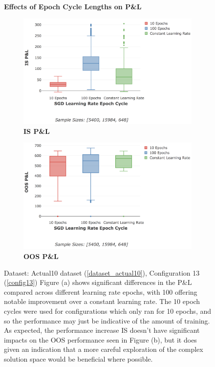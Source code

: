 \documentclass[a4paper,11pt,oneside]{article}
\theoremstyle{plain}
\theoremstyle{definition}
\begin{document}
		
	\begin{figure}[H]
		\centering
		\textbf{Effects of Epoch Cycle Lengths on P\&L}
		\begin{subfigure}{.46\textwidth}
			\centering 
			\includegraphics[scale=0.33]{images/results/8_6_complexity/IS_actual_pl_lr_epochs.png}
			\caption{\textbf{IS P\&L} 
				\newline }
			\label{figure-actual_is_pl_lr_epochs}
		\end{subfigure}%
		\begin{subfigure}{.48\textwidth}
			\centering 
			\includegraphics[scale=0.32]{images/results/8_6_complexity/OOS_actual_pl_lr_epochs.png}
			\caption{\textbf{OOS P\&L} 
				\newline }
			\label{figure-actual_oos_pl_lr_epochs}
		\end{subfigure}
		\caption[Effects of Epoch Cycle Lengths on P\&L]
		{Dataset: Actual10 dataset (\ref{dataset_actual10}), Configuration 13 (\ref{config13})
		\newline Figure (a) shows significant differences in the P\&L compared across different learning rate epochs, with 100 offering notable improvement over  a constant learning rate. The 10 epoch cycles were used for configurations which only ran for 10 epochs, and so the performance may just be indicative of the amount of training. As expected, the performance increase IS doesn't have significant impacts on the OOS performance seen in Figure (b), but it does given an indication that a more careful exploration of the complex solution space would be beneficial where possible.
}
\end{figure}
\end{document}
